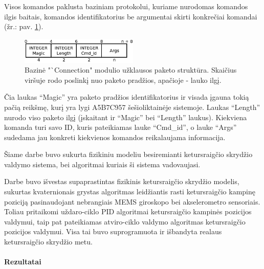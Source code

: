 \documentclass[12pt, a4paper, lithuanian, final]{article}
\begin{document}
Visos komandos paklusta baziniam protokolui, kuriame nurodomas komandos ilgis baitais, komandos identifikatorius be argumentai skirti konkrečiai komandai (žr.: pav. \ref{pav-cmd-proto}).

\begin{figure}[H]
\begin{center}
\includegraphics[width=0.5\textwidth]{img/basePacket.png}
\caption{Bazinė "`Connection" modulio užklausos paketo struktūra. Skaičius viršuje rodo poslinkį nuo paketo pradžios, apačioje - lauko ilgį.}
\label{pav-cmd-proto}
\end{center}
\end{figure}

Čia laukas "`Magic"' yra paketo pradžios identifikatorius ir visada įgauna tokią pačią reikšmę, kurį yra lygi A5B7C957 šešioliktainėje sistemoje.
Laukas "`Length"' nurodo viso paketo ilgį (įskaitant ir "`Magic"' bei "`Length"' laukus). Kiekviena komanda turi savo ID, kuris pateikiamas lauke "`Cmd\_id"', o lauke "`Args"' sudedama jau konkreti kiekvienos komandos reikalaujama informacija.







Šiame darbe buvo sukurta fizikiniu modeliu besiremianti ketursraigčio skrydžio valdymo sistema, bei algoritmai kuriais ši sistema vadovaujasi.


Darbe buvo išvestas supaprastintas fizikinis ketursraigčio skrydžio modelis, sukurtas kvaternionais grystas algoritmas leidžiantis rasti ketursraigčio kampinę poziciją pasinaudojant nebrangiais MEMS giroskopo bei akselerometro sensoriais.
Toliau pritaikomi uždaro-ciklo PID algoritmai ketursraigčio kampinės pozicijos valdymui, taip pat pateikiamas atviro-ciklo valdymo algoritmas ketursraigčio pozicijos valdymui.
Visa tai buvo suprogramuota ir išbandyta realaus ketursraigčio skrydžio metu.


\paragraph{Rezultatai}
\end{document}
